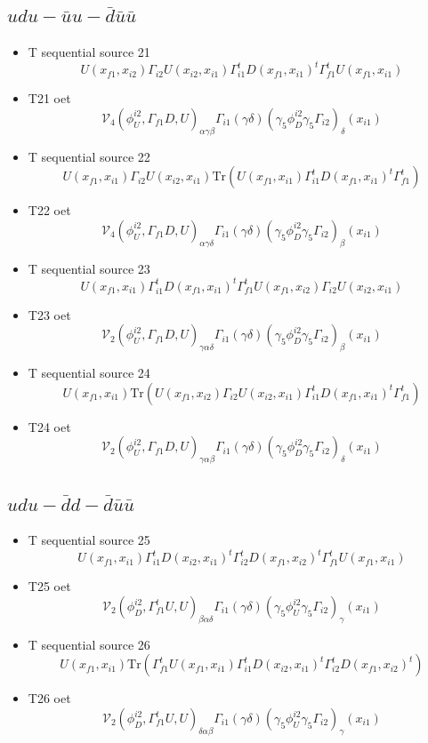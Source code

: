 \documentclass{article}[12pt]
\begin{document}
\subsection{$udu-\bar{u}u-\bar{d}\bar{u}\bar{u}$}
\begin{itemize}
\item  T sequential source 21
$$
U(x_{f1},x_{i2})\Gamma_{i2}U(x_{i2},x_{i1})\Gamma_{i1}^tD(x_{f1},x_{i1})^t\Gamma_{f1}^tU(x_{f1},x_{i1})
$$
\item T21 oet
$$
{\mathcal V}_4\left(\phi_U^{i2},\Gamma_{f1}D,U\right)_{\alpha\gamma\beta}
\Gamma_{i1}(\gamma\delta)(\gamma_5\phi_D^{i2}\gamma_5\Gamma_{i2})_\delta(x_{i1})
$$
\item  T sequential source 22
$$
U(x_{f1},x_{i1})\Gamma_{i2}U(x_{i2},x_{i1})\mathrm{Tr}\left(U(x_{f1},x_{i1})\Gamma_{i1}^tD(x_{f1},x_{i1})^t\Gamma_{f1}^t\right)
$$
\item T22 oet
$$
{\mathcal V}_4\left(\phi_U^{i2},\Gamma_{f1}D,U\right)_{\alpha\gamma\delta}
\Gamma_{i1}(\gamma\delta)(\gamma_5\phi_D^{i2}\gamma_5\Gamma_{i2})_\beta(x_{i1})
$$
\item  T sequential source 23
$$
U(x_{f1},x_{i1})\Gamma_{i1}^tD(x_{f1},x_{i1})^t\Gamma_{f1}^tU(x_{f1},x_{i2})\Gamma_{i2}U(x_{i2},x_{i1})
$$
\item T23 oet
$$
{\mathcal V}_2\left(\phi_U^{i2},\Gamma_{f1}D,U\right)_{\gamma\alpha\delta}
\Gamma_{i1}(\gamma\delta)(\gamma_5\phi_D^{i2}\gamma_5\Gamma_{i2})_\beta(x_{i1})
$$
\item  T sequential source 24
$$
U(x_{f1},x_{i1})\mathrm{Tr}\left(U(x_{f1},x_{i2})\Gamma_{i2}U(x_{i2},x_{i1})\Gamma_{i1}^tD(x_{f1},x_{i1})^t\Gamma_{f1}^t\right)
$$
\item T24 oet
$$
{\mathcal V}_2\left(\phi_U^{i2},\Gamma_{f1}D,U\right)_{\gamma\alpha\beta}
\Gamma_{i1}(\gamma\delta)(\gamma_5\phi_D^{i2}\gamma_5\Gamma_{i2})_\delta(x_{i1})
$$
\end{itemize}
\subsection{$udu-\bar{d}d-\bar{d}\bar{u}\bar{u}$}
\begin{itemize}
\item  T sequential source 25
$$
U(x_{f1},x_{i1})\Gamma_{i1}^tD(x_{i2},x_{i1})^t\Gamma_{i2}^tD(x_{f1},x_{i2})^t\Gamma_{f1}^tU(x_{f1},x_{i1})
$$
\item T25 oet
$$
{\mathcal V}_2\left(\phi_D^{i2},\Gamma_{f1}^tU,U\right)_{\beta\alpha\delta}
\Gamma_{i1}(\gamma\delta)(\gamma_5\phi_U^{i2}\gamma_5\Gamma_{i2})_\gamma(x_{i1})
$$
\item  T sequential source 26
$$
U(x_{f1},x_{i1})\mathrm{Tr}\left(\Gamma_{f1}^tU(x_{f1},x_{i1})\Gamma_{i1}^tD(x_{i2},x_{i1})^t\Gamma_{i2}^tD(x_{f1},x_{i2})^t\right)
$$
\item T26 oet
$$
{\mathcal V}_2\left(\phi_D^{i2},\Gamma_{f1}^tU,U\right)_{\delta\alpha\beta}
\Gamma_{i1}(\gamma\delta)(\gamma_5\phi_U^{i2}\gamma_5\Gamma_{i2})_\gamma(x_{i1})
$$
\end{itemize}
\end{document}
